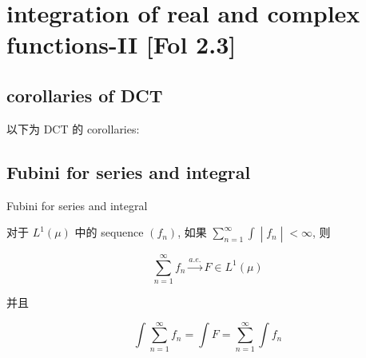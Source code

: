 \documentclass{qlnotes-export}
\begin{document}
\section{integration of real and complex functions-II {[}Fol 2.3{]}}

\subsection{corollaries of DCT}\label{corollaries-of-dct}

以下为 DCT 的 corollaries:

\subsection{Fubini for series and integral}\label{fubini-for-series-and-integral}

\begin{corollary}{Fubini for series and integral}\label{cor-05-integration-of-real-and-complex-functions-fubini-for-series-and-integral}

对于 \(L^{1}(\mu)\) 中的 sequence \((f_{n})\), 如果 \(\left. \sum_{n = 1}^{\infty}\int \middle| f_{n} \middle| < \infty \right.\), 则

\[\sum\limits_{n = 1}^{\infty}f_{n}\overset{a.e.}{\rightarrow}F \in L^{1}(\mu)\]

并且

\[\int\sum\limits_{n = 1}^{\infty}f_{n} = \int F = \sum\limits_{n = 1}^{\infty}\int f_{n}\]

\end{corollary}
\end{document}
